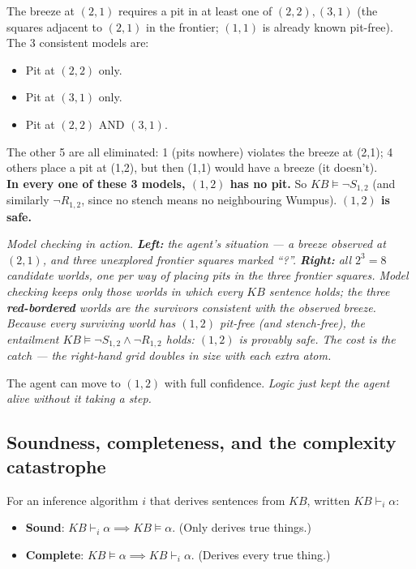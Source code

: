 \documentclass[11pt, a4paper]{article}
\begin{document}
\begin{exbox}
The breeze at $(2,1)$ requires a pit in at least one of $(2,2), (3,1)$ (the squares adjacent to $(2,1)$ in the frontier; $(1,1)$ is already known pit-free).\\[0.3em]
The 3 consistent models are:
\begin{itemize}[leftmargin=*, itemsep=0pt, topsep=0pt]
  \item Pit at $(2,2)$ only.
  \item Pit at $(3,1)$ only.
  \item Pit at $(2,2)$ AND $(3,1)$.
\end{itemize}
The other 5 are all eliminated: 1 (pits nowhere) violates the breeze at (2,1); 4 others place a pit at (1,2), but then (1,1) would have a breeze (it doesn't).\\[0.3em]
\textbf{In every one of these 3 models, $(1,2)$ has no pit.} So $KB \models \neg S_{1,2}$ (and similarly $\neg R_{1,2}$, since no stench means no neighbouring Wumpus). \textbf{$(1,2)$ is safe.}
\end{exbox}

\begin{center}

\footnotesize\textit{Model checking in action. \textbf{Left:} the agent's situation — a breeze observed at $(2,1)$, and three unexplored frontier squares marked ``?''. \textbf{Right:} all $2^3 = 8$ candidate worlds, one per way of placing pits in the three frontier squares. Model checking keeps only those worlds in which every $KB$ sentence holds; the three \textbf{red-bordered} worlds are the survivors consistent with the observed breeze. Because every surviving world has $(1,2)$ pit-free (and stench-free), the entailment $KB \models \neg S_{1,2} \land \neg R_{1,2}$ holds: $(1,2)$ is provably safe. The cost is the catch — the right-hand grid doubles in size with each extra atom.}
\end{center}

The agent can move to $(1,2)$ with full confidence. \emph{Logic just kept the agent alive without it taking a step.}

\subsection{Soundness, completeness, and the complexity catastrophe}

\begin{defbox}
For an inference algorithm $i$ that derives sentences from $KB$, written $KB \vdash_i \alpha$:
\begin{itemize}[itemsep=0pt, topsep=0pt]
  \item \textbf{Sound}: $KB \vdash_i \alpha \implies KB \models \alpha$. (Only derives true things.)
  \item \textbf{Complete}: $KB \models \alpha \implies KB \vdash_i \alpha$. (Derives every true thing.)
\end{itemize}
\end{defbox}
\end{document}
